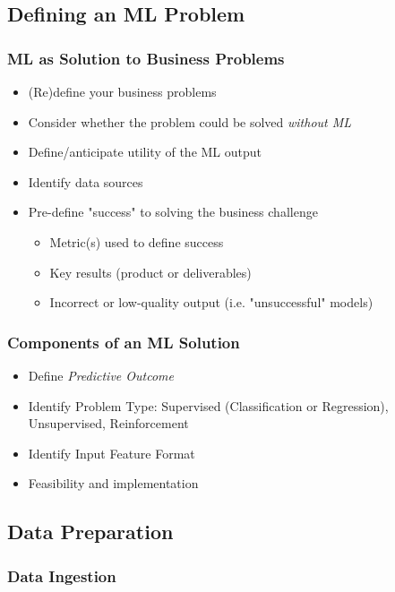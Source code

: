 \documentclass[10pt,landscape,letterpaper]{cheatsheet}
\begin{document}
\begin{multicols}{3}
\subsection{Defining an ML Problem}

\subsubsection{ML as Solution to Business Problems}

\begin{itemize}
    \item (Re)define your business problems
    \item Consider whether the problem could be solved \emph{without ML}
    \item Define/anticipate utility of the ML output
    \item Identify data sources
    \item Pre-define "success" to solving the business challenge
    \begin{itemize}
        \item Metric(s) used to define success
        \item Key results (product or deliverables)
        \item Incorrect or low-quality output (i.e. "unsuccessful" models)
    \end{itemize}
\end{itemize}

\subsubsection{Components of an ML Solution}

\begin{itemize}
    \item Define \emph{Predictive Outcome}
    \item Identify Problem Type: Supervised (Classification or Regression), Unsupervised, Reinforcement
    \item Identify Input Feature Format
    \item Feasibility and implementation
\end{itemize}
 
\subsection{Data Preparation}

\subsubsection{Data Ingestion}


\end{multicols}
\end{document}
